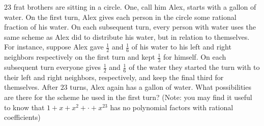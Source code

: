 $23$ frat brothers are sitting in a circle. One, call him Alex, starts with a gallon of water. On the first turn, Alex gives each person in the circle some rational fraction of his water. On each subsequent turn, every person with water uses the same scheme as Alex did to distribute his water, but in relation to themselves. For instance, suppose Alex gave $\frac{1}{2}$ and $\frac{1}{6}$ of his water to his left and right neighbors respectively on the first turn and kept $\frac{1}{3}$ for himself. On each subsequent turn everyone gives $\frac{1}{2}$ and $\frac{1}{6}$ of the water they started the turn with to their left and right neighbors, respectively, and keep the final third for themselves. After $23$ turns, Alex again has a gallon of water. What possibilities are there for the scheme he used in the first turn?
(Note: you may find it useful to know that $1+x+x^2+\cdot +x^{23}$ has no polynomial factors with rational coefficients)